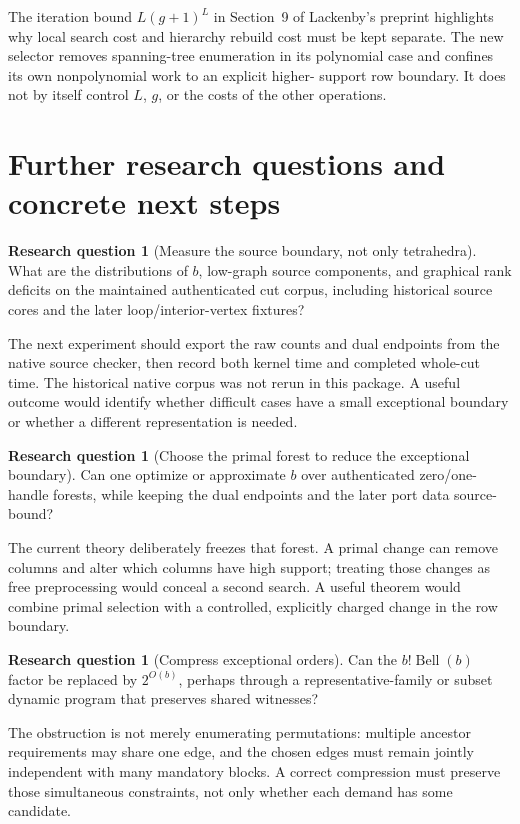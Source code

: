 \documentclass[11pt,letterpaper]{article}
\theoremstyle{definition}
\newtheorem{question}[theorem]{Research question}
\theoremstyle{remark}
\DeclareMathOperator{\Bell}{Bell}
\begin{document}
The iteration bound $L(g+1)^L$ in Section~9 of Lackenby's preprint
\cite{lackenby2026} highlights why local search cost and hierarchy rebuild cost
must be kept separate. The new selector removes spanning-tree enumeration in its
polynomial case and confines its own nonpolynomial work to an explicit higher-
support row boundary. It does not by itself control $L$, $g$, or the costs of the
other operations.

\section{Further research questions and concrete next steps}\label{sec:questions}
\begin{question}[Measure the source boundary, not only tetrahedra]
What are the distributions of $b$, low-graph source components, and graphical
rank deficits on the maintained authenticated cut corpus, including historical
source cores and the later loop/interior-vertex fixtures?
\end{question}
The next experiment should export the raw counts and dual endpoints from the
native source checker, then record both kernel time and completed whole-cut time.
The historical native corpus was not rerun in this package. A useful outcome would identify whether difficult cases have a
small exceptional boundary or whether a different representation is needed.

\begin{question}[Choose the primal forest to reduce the exceptional boundary]
Can one optimize or approximate $b$ over authenticated zero/one-handle forests,
while keeping the dual endpoints and the later port data source-bound?
\end{question}
The current theory deliberately freezes that forest. A primal change can remove
columns and alter which columns have high support; treating those changes as
free preprocessing would conceal a second search. A useful theorem would combine
primal selection with a controlled, explicitly charged change in the row boundary.

\begin{question}[Compress exceptional orders]
Can the $b!\Bell(b)$ factor be replaced by $2^{O(b)}$, perhaps through a
representative-family or subset dynamic program that preserves shared witnesses?
\end{question}
The obstruction is not merely enumerating permutations: multiple ancestor
requirements may share one edge, and the chosen edges must remain jointly
independent with many mandatory blocks. A correct compression must preserve those
simultaneous constraints, not only whether each demand has some candidate.
\end{document}
